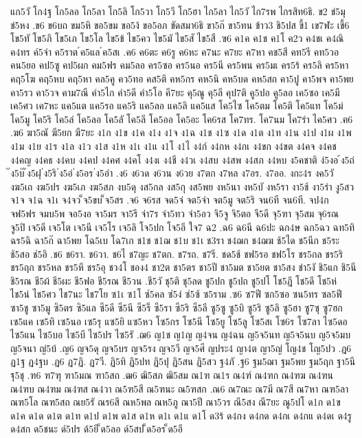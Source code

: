 {{แก5วั
โก4ฐ
โก5ลอ
โก5ลา
โก5ลิ
โก5วา
โก5วี
โก5ฮา
ไก5ลา
ไก5วั
ไก7รพ
ไกรสิท6ธิ.
ข2
ข่5มุ
ข่5หง
.ข6
ข6บถ
ขม5หิ
ขอ5ขม
ขอ5ง้
ขอ5อภ
ขัดสมา6ธิ
ขา5ก๊
ขา5ทน
ข้าว3
ขิ5ปส
ขี้1
เข7ฬะ
เขี้6
โข5ทั
โข5ภิ
โข5เภ
โข5โล
ไข5ข้
ไข5คว
ไข5มั
ไข5สั
ไข5สื
.ฃ6
ค1ค
ค1ช
ค1โ
ค2ว
ค4ชเ
ค4ณิ
ค4ทร
ค์5จำ
ค5ราต
์ค5แล
์ค5สเ
.ค6
ค6ตะ
ค6รู
ค6หะ
ค7นะ
ค7ยะ
ค7หา
คช5สี
คท5รี
คท5วอ
คน5ยอ
คป5ซู
คป5ผก
คม5ฟร
คม5ลอ
คร5ซอ
คร5นอ
คร5นี
คร5พน
คร5มเ
คร5ร้
คร5ลิ
คร5หา
คฤ5โฆ
คฤ5หบ
คฤ5หา
คล5คู
คว5ทอ
คส5ติ
คห5กร
คห5นิ
คห5บด
คห5สถ
คา5ปู
คา5พจ
คา5พย
คา5รว
คา5วจ
คาม7ณี
คำ5ไก
คำ5ดี
คำ5โอ
คี7ยะ
คุ5ณู
คุ5ลี
คุป7ติ
คู5ปอ
คู5ลอ
เค5ซอ
เค5มี
เค5ศว
เค7หะ
แค5แต
แค5รอ
แค5ริ
แค5ลอ
แค5ลิ
แค5แส
โค5ไซ
โค5ตม
โค5ติ
โค5แท
โค5ม่
โค5มู
โค5ริ
โค5ล่
โค5ลอ
โค5ลั
โค5ลี
โค5ออ
โค5อะ
โค6รส
โค7ทร.
โค7นม
โค7รำ
ไค5ศว
.ฅ6
.ฆ6
ฆา5ณั
ฆี5ยก
ฆี7ยะ
ง1ก
ง1ข
ง1ค
ง1ง
ง1จ
ง1ฉ
ง1ช
ง1ซ
ง1ด
ง1ต
ง1ท
ง1น
ง1ป
ง1ผ
ง1พ
ง1ม
ง1ย
ง1ร
ง1ล
ง1ว
ง1ส
ง1ห
ง1เ
ง1แ
ง1โ
ง1ไ
ง4ก์
ง4กห
ง4กเ
ง4ขก
ง4ขต
ง4คจ
ง4คช
ง4คญ
ง4คธ
ง4คบ
ง4คป
ง4คศ
ง4คโ
ง4งเ
ง4ชี
ง4วเ
ง4สบ
ง4สพ
ง4สภ
ง4หบ
ง5คชาติ
ง่5งอ
้ง5ถ่
๊ง5บ๊
้ง5ฝุ
่ง5ริ
่ง5อ่
่ง5อร
่ง5อำ
.ง6
ง6วด
ง6วน
ง6วย
ง7ตก
ง7หล
ง7อร.
ง7ออ.
งกะ4ร
งค5วั
งฆ5เถ
งฆ5ปร
งฆ5เภ
งฆ5สภ
งบ5ดุ
งส5กล
งส5กุ
งส5พย
งห5นา
งห5บั
งห5รา
งา5ช้
งา5รำ
งู5สว
จ1จ
จ1ฉ
จ1เ
จ4จว
็จ5ขบ
็จ5สร
.จ6
จ6รส
จด5จ่
จต5จำ
จต5มู
จต5ริ
จน6ที
จน6ที.
จป4ก
จฟ5ฟร
จมบ5พ
จอ5งอ
จา5มร
จา5รึ
จ่า7ร
จำ5ทว
จำ5อว
จิ5จู
จิ5ตอ
จี5ดี
จุ5ฑา
จุ5สม
จุ6รณ
จู5ปิ
เจ5ดี
เจ5โต
เจ5นี
เจ5โร
เจ5ลิ
โจ5ปก
โจ5อี
ใจ7
ฉ2
.ฉ6
ฉ6นี
ฉ6ปะ
ฉก4ษ
ฉก5ฉว
ฉท5ทิ
ฉร5ฉิ
ฉา5ก๊
ฉา5พย
โฉ5เบ
โฉ7เก
ช1ช
ช1ฌ
ช1บ
ช1เ
ช3รา
ช4ฌก
ช4ฌฆ
ช้5ได
ช5นีก
ช5ระ
ช้5สอ
ช่5อิ
.ช6
ช6รา.
ช6วา.
ช6ไ
ช7ญะ
ช7ตก.
ช7รถ.
ช7รี.
ชด5ช้
ชฟ5รอ
ชฟ5โร
ชร5กล
ชร5ริ
ชร5ฤก
ชร5หล
ชร5หึ
ชร5อุ
ชว4โ
ชอง4
ชา2ต
ชา5ตร
ชา5ปี
ชา5มต
ชา5ยต
ชา5สง
ชำ5งั
ชิ5แก
ชิ5นี
ชิ5รณ
ชี5ผ้
ชี5ผะ
ชี5ฟอ
ชี5รณ
ชี5วน
.ชี5วั
ชุ5ติ
ชุ5ลด
ชู5ปก
ชู5ปถ
ชู5ปโ
โช5ฎึ
โช5ดึ
โช5ห่
ไช5น่
ไช5ศว
ไช7นะ
ไช7โย
ซ1เ
ซ1โ
ซ์5คล
ซ่5ง่
ซ่5ซ้
ซ5ราม
.ซ6
ซ7ฟี
ซก5ซอ
ซน5ทร
ซล5ฟี
ซา5ชู
ซา5มู
ซิ5ตร
ซิ5แล
ซี5ดี
ซี5นี
ซี5ร็
ซี5รา
ซี5ริ
ซี5ลี
ซู5ซู
ซู5บิ
ซู5ริ
ซู5ลิ
ซู5ฮา
ซู7ซุ
ซู7ฮก
เซ5แค
เซ5ทิ
เซ5นอ
เซ5รุ
แซ5ยิ
แซ5หว
โซ5กร
โซ5นี
โซ5ยู
โซ5ลู
โซ5สเ
โซ6ร
โซ7ลา
ไซ5ดอ
ไซ5แน
ไซ5บอ
ไซ5บี
ไซ5ปร
ไซ5รั
.ฌ6
ญ1ช
ญ1ญ
ญ4จน
ญ4ฉน
ญ5จ5นท
ญ5จ5นบ
ญ5จ5มบ
ญ5จนา
ญ่5บ้
.ญ6
ญจ5ดุ
ญจ5บร
ญจ5รง
ญจ5วี
ญจ5ศี
ญประ4
ญา4ต
ญา5ญ่
โญ4ช
โญ5ปว
.ฎ6
ฏ1ฐ
ฏ4ฐบ
.ฏ6
ฏ7ฏิ.
ฏ7วี.
ฏิ5ทิ
ฏิ5ปท
ฏิ5ปุ
ฏิ5สน
ฏิ5สว
ฐ4ภั
.ฐ6
ฐม5ฌา
ฐม5พย
ฐม5ฤก
ฐา5นี
ฐุ5ชุ
.ฑ6
ฑ7ฑุ
ฑา5มณ
ฑา5สถ
.ฒ6
ฒิ5สภ
ฒิ5สม
ณ1ฑ
ณ1ร
ณ4ฑ์
ณ4ฑก
ณ4ฑฆ
ณ4ฑน
ณ4ฑบ
ณ4ฑม
ณ4ฑส
ณ4วา
ณ5ฑ5สี
ณ5ฑนะ
ณ5ฑสก
.ณ6
ณ7ณะ
ณ7มี
ณ7สี
ณ7หา
ณฑ5ลา
ณฑ5โล
ณฑ5สถ
ณย5รั
ณร6สี
ณห5พล
ณห5ภู
ณา5ปี
ณา5วร
ณี5สง
ณี7ยะ
ณู5ปโ
ด1ก
ด1ข
ด1ค
ด1ด
ด1ต
ด1ท
ด1ป
ด1พ
ด1ส
ด1ห
ด1เ
ด1แ
ด1โ
ด3ร้
ด4กง
ด4กด
ด4กเ
ด4กแ
ด4ดเ
ด4รู
ด4สก
ด5ชนะ
ด์5ปร
ด้5ยิ
็ด5ลอ
ด์5สป
็ด5อร
็ด5อึ
}}
